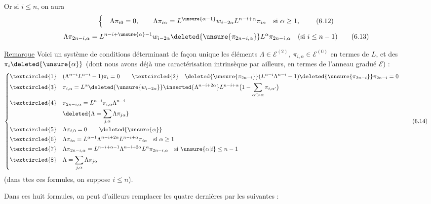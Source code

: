 Or si $i\leq n$, on aura
\[
\left\{\quad\Lambda\pi_{i0}=0,\qquad\Lambda\pi_{i\alpha}=L^{\unsure{\alpha-1}}w_{i-2\alpha}L^{n-i+\alpha}\pi_{i\alpha}\quad\text{si }\alpha\geq1,\right.
\tag{6.12}
\]
\[
\Lambda\pi_{2n-i,\alpha}=L^{n-i+\unsure{\alpha}-1}w_{i-2\alpha}\deleted{\unsure{\pi_{2n-i,\alpha}}}L^\alpha\pi_{2n-i,\alpha}\quad(\text{si }i\leq n-1)
\tag{6.13}
\]

\uline{Remarque} Voici un système de conditions déterminant de façon unique les éléments $\Lambda\in\mathcal E^{(2)},\ \pi_{i,\alpha}\in\mathcal E^{(0)}$ en termes de $L$, et des $\pi_i\deleted{\unsure{\alpha}}$ (dont nous avons déjà une caractérisation intrinsèque par ailleurs, en termes de l'anneau gradué $\mathcal E$) :
\[
\left\{\begin{aligned}
\textcircled{1}\quad &(\Lambda^{n-i}L^{n-i}-1)\pi_i=0
\qquad\textcircled{2}\quad\deleted{\unsure{\pi_{2n-i}}}(L^{n-i}\Lambda^{n-i}-1)\deleted{\unsure{\pi_{2n-i}}}\pi_{2n-i}=0\\
\textcircled{3}\quad &\pi_{i,\alpha}=L^\alpha\deleted{\unsure{w_{i-2\alpha}}}\inserted{\Lambda^{n-i+2\alpha}}L^{n-i+\alpha}\bigl(1-\sum_{\alpha'>\alpha}\pi_{i,\alpha'}\bigr)\\
\textcircled{4}\quad &\pi_{2n-i,\alpha}=L^{n-i}\pi_{i,\alpha}\Lambda^{n-i}\\
&\deleted{\Lambda=\sum_{j,\alpha}\Lambda\pi_{j\alpha}}\\
\textcircled{5}\quad &\Lambda\pi_{i,0}=0\qquad\deleted{\unsure{\alpha}}\\
\textcircled{6}\quad &\Lambda\pi_{i\alpha}=L^{\alpha-1}\Lambda^{n-i+2\alpha}L^{n-i+\alpha}\pi_{i\alpha}\quad\text{si }\alpha\geq1\\
\textcircled{7}\quad &\Lambda\pi_{2n-i,\alpha}=L^{n-i+\alpha-1}\Lambda^{n-i+2\alpha}L^\alpha\pi_{2n-i,\alpha}\quad\text{si }\unsure{\alpha|i}\leq n-1\\
\textcircled{8}\quad &\Lambda=\sum_{j,\alpha}\Lambda\pi_{j\alpha}
\end{aligned}\right.
\tag{6.14}
\]
(dans ttes ces formules, on suppose $i\leq n$).

Dans ces huit formules, on peut d'ailleurs remplacer les quatre dernières par les suivantes  :
